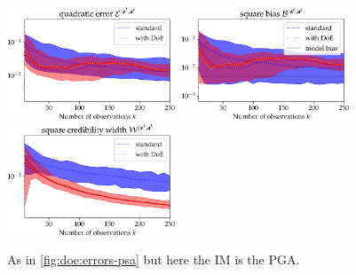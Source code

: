     \begin{figure}[h]
        \centering
        \includegraphics[width=5cm]{figures/DoE/errE_PGA.pdf}\ \includegraphics[width=5cm]{figures/DoE/errB_PGA.pdf}\ \includegraphics[width=5cm]{figures/DoE/errW_PGA.pdf}%
        \caption{As in \cref{fig:doe:errors-psa} but here the IM  is the PGA.}
        \label{fig:doe:errors-pga}
    \end{figure}




